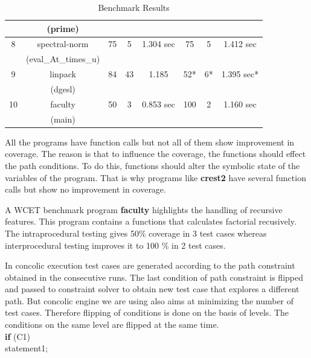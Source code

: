 \documentclass[12pt,oneside]{book}
\begin{document}
\begin{table}[hbtp]
{\begin{tabular}{|c|c|c|c|c|c|c|c|}
  &	(prime) & & & & & & \\ [1ex]\hline
8                        & spectral-norm                          & 75                & 5              			& 1.304 sec  & 75			& 5			& 1.412 sec   \\[1ex] 
  &	(eval\_At\_times\_u) & & & & & & \\ [1ex]\hline
9		   & linpack		& 84		& 43		& 1.185			&52*			& 6*			& 1.395 sec*
\\[1ex]
  &	(dgesl) & & & & & & \\ [1ex]\hline
10			& faculty		& 50		& 3			& 0.853 sec 	& 100			& 2				& 1.160 sec
\\[1ex] 
  &	(main) & & & & & & \\ [1ex]\hline


\end{tabular}}
\caption{Benchmark Results}
\end{table}


All the programs have function calls but not all of them show improvement in coverage. The reason is that to influence the coverage, the functions should effect the path conditions. To do this, functions should alter the symbolic state of the variables of the program. That is why programs like \textbf{crest2} have several function calls but show no improvement in coverage. 

A WCET benchmark program \textbf{faculty} highlights the handling of recursive features. This program contains a functions that calculates factorial recusively. The intraprocedural testing gives 50\% coverage in 3 test cases whereas interprocedural testing improves it to 100 \% in 2 test cases.  

In concolic execution test cases are generated according to the path constraint obtained in the consecutive runs. The last condition of path constraint is flipped and passed to constraint solver to obtain new test case that explores a different path. But concolic engine we are using also aims at minimizing the number of test cases. Therefore flipping of conditions is done on the basis of levels. The conditions on the same level are flipped at the same time.\\ 

\vspace{-5mm}
\hspace{5cm}
\textbf{if} (C1)   \\

\vspace{-10mm}
\hspace{5.25cm} statement1;
\hspace{6cm}\\ 
\end{document}
